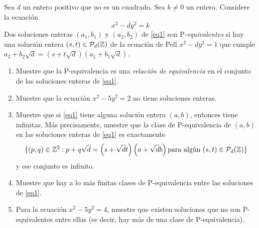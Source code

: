 \begin{prob}[2 pts. c/u]
	Sea $d$ un entero positivo que no es un cuadrado. Sea $k\neq0$ un entero. Considere la ecuación
	\begin{equation}
		x^2-dy^2=k\label{eq1}
	\end{equation}
	Dos soluciones enteras $(a_1,b_1)$ y $(a_2,b_2)$ de \eqref{eq1} son P-\textit{equivalentes} si hay una solución entera $(s,t)\in\mathcal{P}_d(\mathbb{Z})$ de la ecuación de Pell $x^2-dy^2=1$ que cumple $a_2+b_2\sqrt{d}=(s+t\sqrt{d})(a_1+b_1\sqrt{d})$.
	\begin{enumerate}[label = (\roman*)]
		\item Muestre que la P-equivalencia es una \textit{relación de equivalencia} en el conjunto de las soluciones enteras de \eqref{eq1}.

		\item Muestre que la ecuación $x^2-5y^2=2$ no tiene soluciones enteras.

		\item Muestre que si \eqref{eq1} tiene alguna solución entera $(a,b)$, entonces tiene infinitas. Más precisamente, muestre que la clase de P-equivalencia de $(a,b)$ en las soluciones enteras de \eqref{eq1} es exactamente
		      \[
			      \{(p,q)\in\mathbb{Z}^2: p+q\sqrt{d}=\left(s+\sqrt{d}t\right)\left(a+\sqrt{d}b\right)\text{para algún }(s,t)\in\mathcal{P}_d(\mathbb{Z})\}
		      \]
		      y ese conjunto es infinito.

		\item Muestre que hay a lo más finitas clases de P-equivalencia entre las soluciones de \eqref{eq1}.

		\item Para la ecuación $x^2-5y^2=4$, muestre que existen soluciones que no son P-equivalentes entre ellas (es decir, hay más de una clase de P-equivalencia).
	\end{enumerate}
\end{prob}

